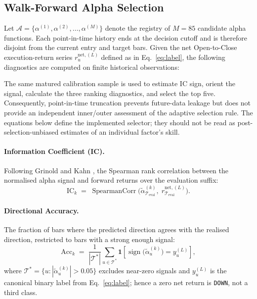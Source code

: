 \subsection{Walk-Forward Alpha Selection}

Let $\mathcal{A} = \bigl\{\alpha^{(1)}, \alpha^{(2)}, \ldots,
\alpha^{(M)}\bigr\}$ denote the registry of $M = 85$ candidate alpha
functions. Each point-in-time history ends at the decision cutoff and is
therefore disjoint from the current entry and target bars. Given the net
Open-to-Close execution-return series $r^{\mathrm{net},(L)}_u$ defined as in
Eq.~\eqref{eq:label}, the following diagnostics are computed on finite
historical observations:

The same matured calibration sample is used to estimate IC sign, orient the
signal, calculate the three ranking diagnostics, and select the top five.
Consequently, point-in-time truncation prevents future-data leakage but does
not provide an independent inner/outer assessment of the adaptive selection
rule. The equations below define the implemented selector; they should not be
read as post-selection-unbiased estimates of an individual factor's skill.

\paragraph{Information Coefficient (IC).}
Following Grinold and Kahn \cite{grinold1999active}, the Spearman rank correlation between the normalised alpha signal and
forward returns over the evaluation suffix:
\begin{equation}
    \mathrm{IC}_k \;=\;
    \operatorname{SpearmanCorr}\!\bigl(
        \tilde{\alpha}^{(k)}_{\mathcal{T}_{\mathrm{eval}}},\;
        r^{\mathrm{net},(L)}_{\mathcal{T}_{\mathrm{eval}}}
    \bigr).
    \label{eq:ic}
\end{equation}

\paragraph{Directional Accuracy.}
The fraction of bars where the predicted direction agrees with the
realised direction, restricted to bars with a strong enough signal:
\begin{equation}
    \mathrm{Acc}_k \;=\;
    \frac{1}{|\mathcal{T}^*|}
    \sum_{u \in \mathcal{T}^*}
    \mathbf{1}\!\left[
        \operatorname{sign}\!\bigl(\tilde{\alpha}^{(k)}_u\bigr)
        = y^{(L)}_u
    \right],
\end{equation}
where $\mathcal{T}^* = \bigl\{u : |\tilde{\alpha}^{(k)}_u| > 0.05\bigr\}$
excludes near-zero signals and $y^{(L)}_u$ is the canonical binary label from
Eq.~\eqref{eq:label}; hence a zero net return is \texttt{DOWN}, not a third class.

